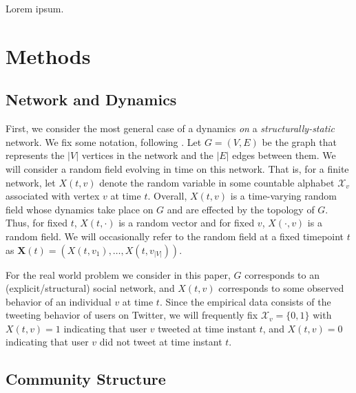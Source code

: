 \documentclass[12pt]{article}
\begin{document}

Lorem ipsum.

\section{Methods}

\subsection{Network and Dynamics}

First, we consider the most general case of a dynamics \emph{on} a \emph{structurally-static} network. We fix some notation, following \cite{kolaczyk2009statistical}. Let $G = (V, E)$ be the graph that represents the $|V|$ vertices in the network and the $|E|$ edges between them. We will consider a random field evolving in time on this network. That is, for a finite network, let $X(t, v)$ denote the random variable in some countable alphabet $\mathcal{X}_{v}$ associated with vertex $v$ at time $t$. Overall, $X(t, v)$ is a time-varying random field whose dynamics take place on $G$ and are effected by the topology of $G$. Thus, for fixed $t$, $X(t, \cdot)$ is a random vector and for fixed $v$, $X(\cdot, v)$ is a random field. We will occasionally refer to the random field at a fixed timepoint $t$ as $\mathbf{X}(t) = (X(t, v_{1}), \ldots, X(t, v_{|V|})).$

For the real world problem we consider in this paper, $G$ corresponds to an (explicit/structural) social network, and $X(t,v)$ corresponds to some observed behavior of an individual $v$ at time $t$. Since the empirical data consists of the tweeting behavior of users on Twitter, we will frequently fix $\mathcal{X}_{v} = \{0, 1\}$ with $X(t, v) = 1$ indicating that user $v$ tweeted at time instant $t$, and $X(t, v) = 0$ indicating that user $v$ did not tweet at time instant $t$.

\subsection{Community Structure}
\end{document}
